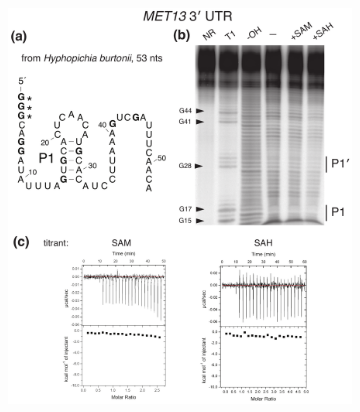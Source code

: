 \documentclass[12pt]{report}
\begin{document}
\begin{figure}
	\begin{subfigure}{1\textwidth}
		\center
		\includegraphics[width=6.5in, height=8in,keepaspectratio]{figures/figure_S5.pdf}	
	\end{subfigure}
	

\end{figure}
\end{document}
